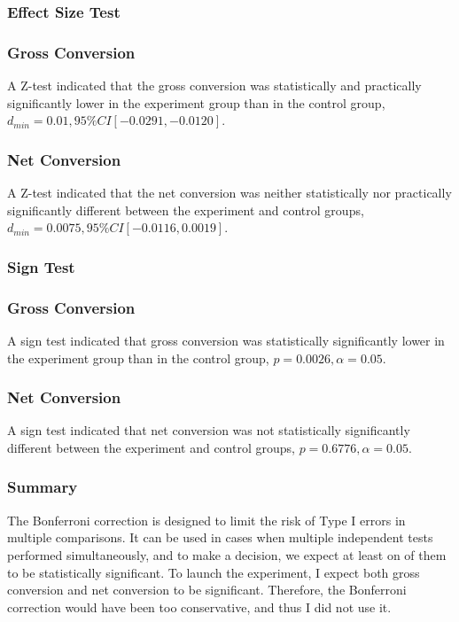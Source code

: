 \documentclass{article}
\begin{document}
\begin{multicols}{2}
\subsubsection{Effect Size Test}

\subsubsection{Gross Conversion}

A Z-test indicated that the gross conversion was statistically and practically significantly lower in the experiment group than in the control group, \(d_{min}=0.01, 95\% CI [-0.0291, -0.0120]\).

\subsubsection{Net Conversion}

A Z-test indicated that the net conversion was neither statistically nor practically significantly different between the experiment and control groups, \(d_{min}=0.0075, 95\% CI[-0.0116, 0.0019]\).

\subsubsection{Sign Test}

\subsubsection{Gross Conversion}

A sign test indicated that gross conversion was statistically significantly lower in the experiment group than in the control group, \(p=0.0026, \alpha=0.05\).

\subsubsection{Net Conversion}

A sign test indicated that net conversion was not statistically significantly different between the experiment and control groups, \(p=0.6776, \alpha=0.05\).

\subsubsection{Summary}

The Bonferroni correction is designed to limit the risk of Type I errors in multiple comparisons. It can be used in cases when multiple independent tests performed simultaneously, and to make a decision, we expect at least on of them to be statistically significant. To launch the experiment, I expect both gross conversion and net conversion to be significant. Therefore, the Bonferroni correction would have been too conservative, and thus I did not use it.


\end{multicols}
\end{document}
